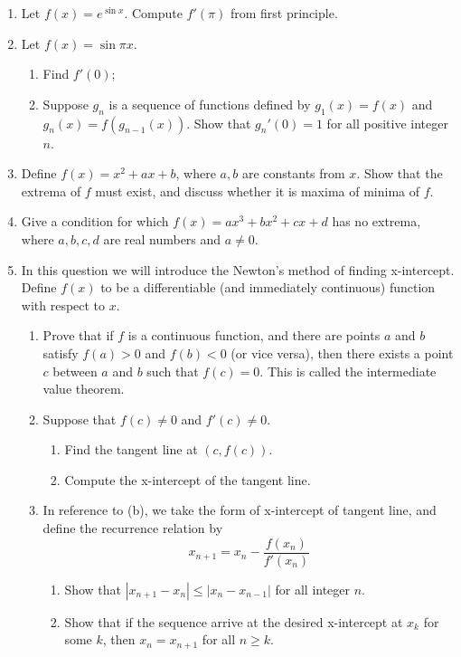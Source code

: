 \documentclass[12pt]{article}
\begin{document}
\begin{enumerate}
    \item Let $f(x)=e^{\sin{x}}$. Compute $f'(\pi)$ from first principle.
    \item Let $f(x)=\sin{\pi x}$.\begin{enumerate}
        \item Find $f'(0)$;
        \item Suppose $g_n$ is a sequence of functions defined by $g_1(x)=f(x)$ and $g_n(x)=f(g_{n-1}(x))$. Show that $g_n'(0)=1$ for all positive integer $n$.
    \end{enumerate}
    \item Define $f(x)=x^2+ax+b$, where $a,b$ are constants from $x$. Show that the extrema of $f$ must exist, and discuss whether it is maxima of minima of $f$.
    \item Give a condition for which $f(x)=ax^3+bx^2+cx+d$ has no extrema, where $a,b,c,d$ are real numbers and $a\neq 0$.
    \item In this question we will introduce the Newton's method of finding x-intercept. Define $f(x)$ to be a differentiable (and immediately continuous) function with respect to $x$.\begin{enumerate}
        \item Prove that if $f$ is a continuous function, and there are points $a$ and $b$ satisfy $f(a)>0$ and $f(b)<0$ (or vice versa), then there exists a point $c$ between $a$ and $b$ such that $f(c)=0$. This is called the intermediate value theorem.
        \item Suppose that $f(c)\neq 0$ and $f'(c)\neq 0$. \begin{enumerate}
            \item Find the tangent line at $(c,f(c))$.
            \item Compute the x-intercept of the tangent line.
        \end{enumerate}
        \item In reference to (b), we take the form of x-intercept of tangent line, and define the recurrence relation by $$x_{n+1}=x_n-\frac{f(x_n)}{f'(x_n)}$$ \begin{enumerate}
            \item Show that $|x_{n+1}-x_n|\leq |x_n-x_{n-1}|$ for all integer $n$.
            \item Show that if the sequence arrive at the desired x-intercept at $x_k$ for some $k$, then $x_n=x_{n+1}$ for all $n \geq k$.
        \end{enumerate}

\end{enumerate}
\end{enumerate}
\end{document}
